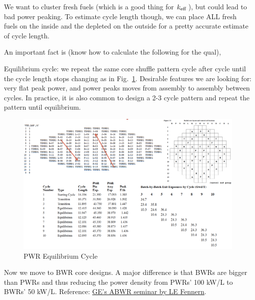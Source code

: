 \documentclass{school-22.211-notes}
\begin{document}
We want to cluster fresh fuels (which is a good thing for $\left. k_{\mathrm{eff}} \right.$), but could lead to bad power peaking. To estimate cycle length though, we can place ALL fresh fuels on the inside and the depleted on the outside for a pretty accurate estimate of cycle length. 

An important fact is (know how to calculate the following for the qual), 

Equilibrium cycle: we repeat the same core shuffle pattern cycle after cycle until the cycle length stops changing as in Fig.~\ref{PWR-equil-cycle}. Desirable features we are looking for: very flat peak power, and power peaks moves from assembly to assembly between cycles. In practice, it is also common to design a 2-3 cycle pattern and repeat the pattern until equilibrium.
\begin{figure}[ht]
  \centering
  \includegraphics[width=5in]{images/design/PWR-equil-cycle.png}
  \caption{PWR Equilibrium Cycle} \label{PWR-equil-cycle}
\end{figure}


\clearpage
{} 
Now we move to BWR core designs. A major difference is that BWRs are bigger than PWRs and thus reducing the power density from PWRs' 100 kW/L to BWRs' 50 kW/L. Reference: \href{http://www.ne.doe.gov/np2010/pdfs/ABWRReactorCoreNeutronics.pdf}{GE's ABWR seminar by LE Fennern}.
\end{document}
